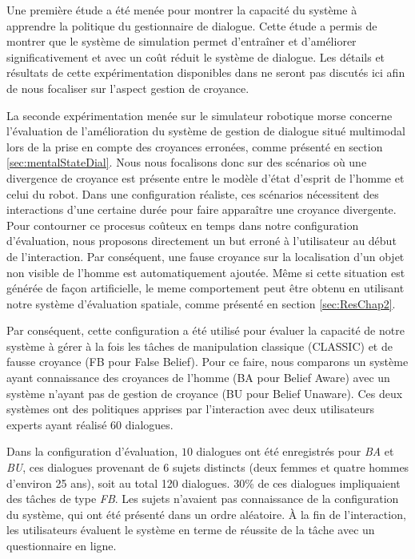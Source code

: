 \documentclass[a4paper,11pt,twoside]{StyleThese}
\begin{document}
Une première étude a été menée pour montrer la capacité du système à apprendre la politique du gestionnaire de dialogue. Cette étude a permis de montrer que le système de simulation permet d'entraîner et d'améliorer significativement et avec un coût réduit le système de dialogue. Les détails et résultats de cette expérimentation disponibles dans \cite{simpar_2014} ne seront pas discutés ici afin de nous focaliser sur l'aspect gestion de croyance.

La seconde expérimentation menée sur le simulateur robotique morse concerne l'évaluation de l'amélioration du système de gestion de dialogue situé multimodal lors de la prise en compte des croyances erronées, comme présenté en section \ref{sec:mentalStateDial}.
Nous nous focalisons donc sur des scénarios où une divergence de croyance est présente entre le modèle d'état d'esprit de l'homme et celui du robot. 
Dans une configuration réaliste, ces scénarios nécessitent des interactions d'une certaine durée pour faire apparaître une croyance divergente. Pour contourner ce procesus coûteux en temps dans notre configuration d'évaluation, nous proposons directement un but erroné à l'utilisateur au début de l'interaction. 
Par conséquent, une fause croyance sur la localisation d'un objet non visible de l'homme est automatiquement ajoutée. Même si cette situation est générée de façon artificielle, le meme comportement peut être obtenu en utilisant notre système d'évaluation spatiale, comme présenté en section \ref{sec:ResChap2}.

Par conséquent, cette configuration a été utilisé pour évaluer la capacité de notre système à gérer à la fois les tâches de manipulation classique (CLASSIC) et de fausse croyance (FB pour False Belief).
Pour ce faire, nous comparons un système ayant connaissance des croyances de l'homme (BA pour Belief Aware) avec un système n'ayant pas de gestion de croyance (BU pour Belief Unaware). Ces deux systèmes ont des politiques apprises par l'interaction avec deux utilisateurs experts ayant réalisé $60$ dialogues.

Dans la configuration d'évaluation, $10$ dialogues ont été enregistrés pour \textit{BA} et \textit{BU}, ces dialogues provenant de 6 sujets distincts (deux femmes et quatre hommes d'environ 25 ans), soit au total 120 dialogues. $30$\% de ces dialogues impliquaient des tâches de type \textit{FB}. Les sujets n'avaient pas connaissance de la configuration du système, qui ont été présenté dans un ordre aléatoire. À la fin de l'interaction, les utilisateurs évaluent le système en terme de réussite de la tâche avec un questionnaire en ligne.
\end{document}

